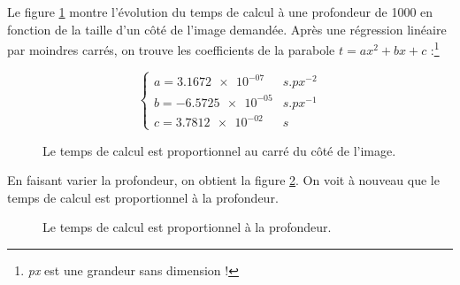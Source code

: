 Le figure \ref{fig:mandel-seq-taille} montre l'évolution du temps de
calcul à une profondeur de 1000 en fonction de la taille d'un côté de
l'image demandée. Après une régression linéaire par moindres carrés,
on trouve les coefficients de la parabole $t = a x^2 + b x + c$
:\footnote{\textit{px} est une grandeur sans dimension !}


\[ \begin{cases}
    a = \num{3.1672e-07}  & s.px^{-2}\\
    b = \num{-6.5725e-05} & s.px^{-1}\\
    c = \num{3.7812e-02}  & s\end{cases} \]

\begin{figure}[t]
  \centering


  \caption{Le temps de calcul est proportionnel au carré du côté de l'image.}
  \label{fig:mandel-seq-taille}
\end{figure}

En faisant varier la profondeur, on obtient la figure
\ref{fig:mandel-seq-prof}. On voit à nouveau que le temps de calcul
est proportionnel à la profondeur.

\begin{figure}
  \centering
  \caption{Le temps de calcul est proportionnel à la profondeur.}
  \label{fig:mandel-seq-prof}
\end{figure}

